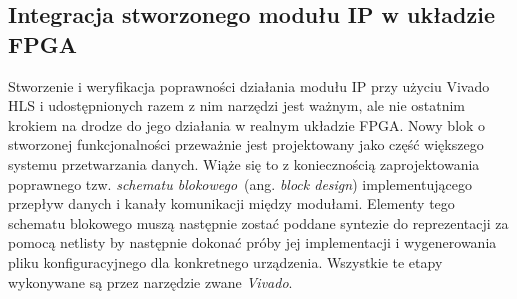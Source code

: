 \subsection{Integracja stworzonego modułu IP w układzie FPGA}
Stworzenie i weryfikacja poprawności działania modułu IP przy użyciu Vivado HLS i udostępnionych razem z nim narzędzi jest ważnym, ale nie ostatnim krokiem na drodze do jego działania w realnym układzie FPGA. Nowy blok o stworzonej funkcjonalności przeważnie jest projektowany jako część większego systemu przetwarzania danych. Wiąże się to z koniecznością zaprojektowania poprawnego tzw. \textit{schematu blokowego}~(ang. \textit{block design}) implementującego przepływ danych i kanały komunikacji między modułami. Elementy tego schematu blokowego muszą następnie zostać poddane syntezie do reprezentacji za pomocą netlisty by następnie dokonać próby jej implementacji i wygenerowania pliku konfiguracyjnego dla konkretnego urządzenia. Wszystkie te etapy wykonywane są przez narzędzie zwane \textit{Vivado}.
